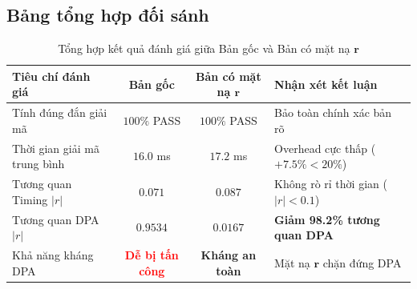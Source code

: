 \documentclass[../LuanVan.tex]{subfiles}
\begin{document}

\subsection{Bảng tổng hợp đối sánh}

\begin{table}[H]
\centering
\caption{Tổng hợp kết quả đánh giá giữa Bản gốc và Bản có mặt nạ $\mathbf{r}$}
\label{tab:summary}
\begin{tabularx}{\textwidth}{l c c X}
\toprule
\textbf{Tiêu chí đánh giá} & \textbf{Bản gốc} & \textbf{Bản có mặt nạ $\mathbf{r}$} & \textbf{Nhận xét kết luận} \\
\midrule
Tính đúng đắn giải mã & $100\%$ PASS & $100\%$ PASS & Bảo toàn chính xác bản rõ \\
Thời gian giải mã trung bình & $16.0$ ms & $17.2$ ms & Overhead cực thấp ($+7.5\% < 20\%$) \\
Tương quan Timing $|r|$ & $0.071$ & $0.087$ & Không rò rỉ thời gian ($|r| < 0.1$) \\
Tương quan DPA $|r|$ & $0.9534$ & $0.0167$ & \textbf{Giảm 98.2\% tương quan DPA} \\
Khả năng kháng DPA & \textcolor{red}{\textbf{Dễ bị tấn công}} & \textcolor{green!60!black}{\textbf{Kháng an toàn}} & Mặt nạ $\mathbf{r}$ chặn đứng DPA \\
\bottomrule
\end{tabularx}
\end{table}

\end{document}
